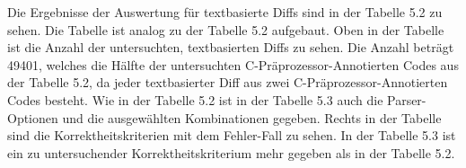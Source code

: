 Die Ergebnisse der Auswertung für textbasierte Diffs sind in der Tabelle 5.2 zu sehen. Die Tabelle ist analog zu der Tabelle 5.2 aufgebaut. Oben in der Tabelle ist die Anzahl der untersuchten, textbasierten Diffs zu sehen. Die Anzahl beträgt 49401, welches die Hälfte der untersuchten C-Präprozessor-Annotierten Codes aus der Tabelle 5.2, da jeder textbasierter Diff aus zwei C-Präprozessor-Annotierten Codes besteht. Wie in der Tabelle 5.2 ist in der Tabelle 5.3 auch die Parser-Optionen und die ausgewählten Kombinationen gegeben. Rechts in der Tabelle sind die Korrektheitskriterien mit dem Fehler-Fall zu sehen. In der Tabelle 5.3 ist ein zu untersuchender Korrektheitskriterium mehr gegeben als in der Tabelle 5.2. \\
\begin{table}[h]
\caption{Ergebnisse der Auswertung für das Unparsen von textbasierten Diffs}
\end{table}

